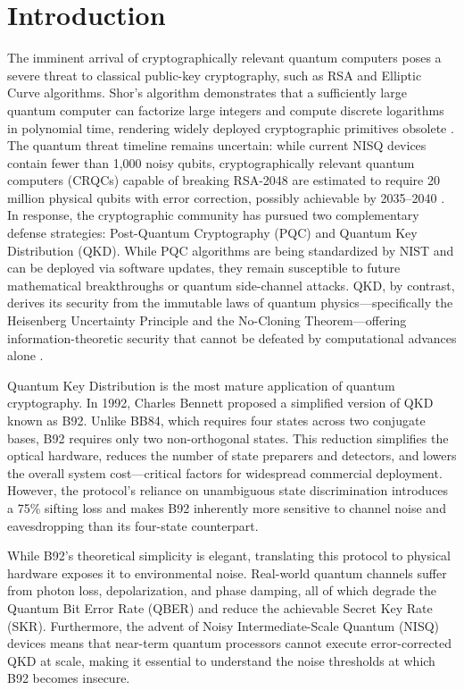 \documentclass[conference]{IEEEtran}
\begin{document}
\section{Introduction}\label{sec1}
The imminent arrival of cryptographically relevant quantum computers poses a severe threat to classical public-key cryptography, such as RSA and Elliptic Curve algorithms. Shor's algorithm demonstrates that a sufficiently large quantum computer can factorize large integers and compute discrete logarithms in polynomial time, rendering widely deployed cryptographic primitives obsolete \cite{shor1994algorithms}. The quantum threat timeline remains uncertain: while current NISQ devices contain fewer than 1,000 noisy qubits, cryptographically relevant quantum computers (CRQCs) capable of breaking RSA-2048 are estimated to require 20 million physical qubits with error correction, possibly achievable by 2035--2040 \cite{mosca2018cybersecurity}. In response, the cryptographic community has pursued two complementary defense strategies: Post-Quantum Cryptography (PQC) and Quantum Key Distribution (QKD). While PQC algorithms are being standardized by NIST and can be deployed via software updates, they remain susceptible to future mathematical breakthroughs or quantum side-channel attacks. QKD, by contrast, derives its security from the immutable laws of quantum physics—specifically the Heisenberg Uncertainty Principle and the No-Cloning Theorem—offering information-theoretic security that cannot be defeated by computational advances alone \cite{scarani2009security}.

Quantum Key Distribution is the most mature application of quantum cryptography. In 1992, Charles Bennett \cite{bennett1992quantum} proposed a simplified version of QKD known as B92. Unlike BB84, which requires four states across two conjugate bases, B92 requires only two non-orthogonal states. This reduction simplifies the optical hardware, reduces the number of state preparers and detectors, and lowers the overall system cost—critical factors for widespread commercial deployment. However, the protocol's reliance on unambiguous state discrimination introduces a 75\% sifting loss and makes B92 inherently more sensitive to channel noise and eavesdropping than its four-state counterpart.

While B92's theoretical simplicity is elegant, translating this protocol to physical hardware exposes it to environmental noise. Real-world quantum channels suffer from photon loss, depolarization, and phase damping, all of which degrade the Quantum Bit Error Rate (QBER) and reduce the achievable Secret Key Rate (SKR). Furthermore, the advent of Noisy Intermediate-Scale Quantum (NISQ) devices means that near-term quantum processors cannot execute error-corrected QKD at scale, making it essential to understand the noise thresholds at which B92 becomes insecure.
\end{document}
